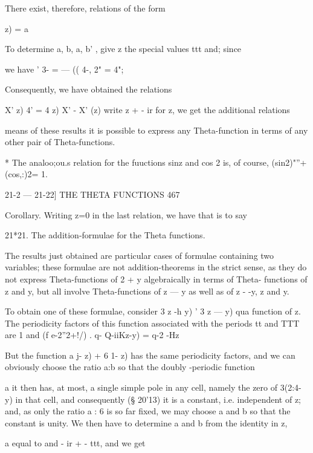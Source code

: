 There exist, therefore, relations of the form

     z) = a%

To determine a, b, a, b' , give z the special values ttt and; since

we have ' 3- = — (( 4-, 2" = 4"; %

Consequently, we have obtained the relations

X' z) 4' = 4 z) X' - X' (z) %
write z + - ir for z, we get the additional relations

means of these results it is possible to express any Theta-function in
terms of any other pair of Theta-functions.

* The analoo;ou.s relation for the fuuctions sinz and cos 2 is, of
course, (sin2)"''+(cos,:)2= 1.

21-2 — 21-22] THE THETA FUNCTIONS 467

Corollary. Writing z=0 in the last relation, we have that is to say

21*21. The addition-formulae for the Theta functions.

The results just obtained are particular cases of formulae containing
two variables; these formulae are not addition-theorems in the strict
sense, as they do not express Theta-functions of 2 + y algebraically
in terms of Theta- functions of z and y, but all involve
Theta-functions of z — y as well as of z - -y, z and y.

To obtain one of these formulae, consider 3 z -h y) ' 3 z — y) qua
function of z. The periodicity factors of this function associated
with the periods tt and TTT are 1 and (f e-2''2+!/) . q- Q-iiKz-y) =
q-2 -Hz

But the function a j- z) + 6 1- z) has the same periodicity factors,
and we can obviously choose the ratio a:b so that the doubly -periodic
function

a%
it then has, at most, a single simple pole in any cell, namely the
zero of 3(2:4- y) in that cell, and consequently (§ 20'13) it is a
constant, i.e. independent of z; and, as only the ratio a : 6 is so
far fixed, we may choose a and b so that the constant is unity. We
then have to determine a and b from the identity in z,

a%
equal to and - ir + - ttt, and we get

